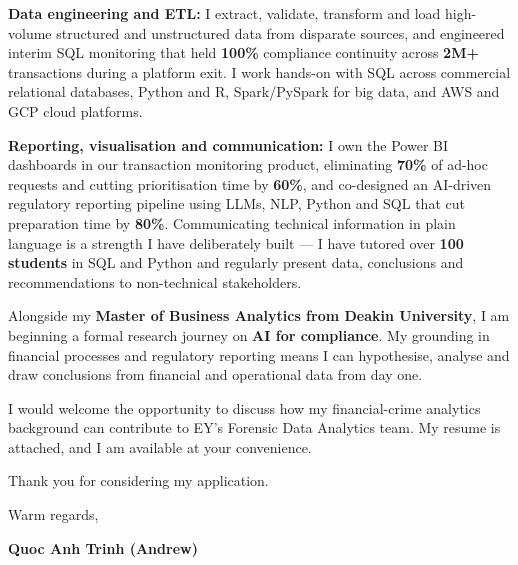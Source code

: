 \documentclass[11pt, a4paper]{letter}
\begin{document}
\textbf{Data engineering and ETL:}
I extract, validate, transform and load high-volume structured and unstructured data from disparate sources, and engineered interim SQL monitoring that held \textbf{100\%} compliance continuity across \textbf{2M+} transactions during a platform exit. I work hands-on with SQL across commercial relational databases, Python and R, Spark/PySpark for big data, and AWS and GCP cloud platforms.

\textbf{Reporting, visualisation and communication:}
I own the Power BI dashboards in our transaction monitoring product, eliminating \textbf{70\%} of ad-hoc requests and cutting prioritisation time by \textbf{60\%}, and co-designed an AI-driven regulatory reporting pipeline using LLMs, NLP, Python and SQL that cut preparation time by \textbf{80\%}. Communicating technical information in plain language is a strength I have deliberately built --- I have tutored over \textbf{100 students} in SQL and Python and regularly present data, conclusions and recommendations to non-technical stakeholders.

Alongside my \textbf{Master of Business Analytics from Deakin University}, I am beginning a formal research journey on \textbf{AI for compliance}. My grounding in financial processes and regulatory reporting means I can hypothesise, analyse and draw conclusions from financial and operational data from day one.

I would welcome the opportunity to discuss how my financial-crime analytics background can contribute to EY's Forensic Data Analytics team. My resume is attached, and I am available at your convenience.

Thank you for considering my application.

\vspace{6pt}

Warm regards,

\vspace{14pt}

\textbf{Quoc Anh Trinh (Andrew)}
\end{document}
